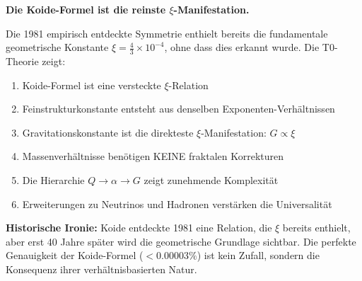 	\begin{theorem}
		\textbf{Die Koide-Formel ist die reinste $\xi$-Manifestation.}
		
		Die 1981 empirisch entdeckte Symmetrie enthielt bereits die fundamentale geometrische Konstante $\xi = \frac{4}{3} \times 10^{-4}$, ohne dass dies erkannt wurde. Die T0-Theorie zeigt:
		
		\begin{enumerate}
			\item Koide-Formel ist eine versteckte $\xi$-Relation
			\item Feinstrukturkonstante entsteht aus denselben Exponenten-Verhältnissen
			\item Gravitationskonstante ist die direkteste $\xi$-Manifestation: $G \propto \xi$
			\item Massenverhältnisse benötigen KEINE fraktalen Korrekturen
			\item Die Hierarchie $Q \to \alpha \to G$ zeigt zunehmende Komplexität
			\item Erweiterungen zu Neutrinos und Hadronen verstärken die Universalität
		\end{enumerate}
	\end{theorem}
	
	\vspace{1cm}
	
	\noindent\textbf{Historische Ironie:} Koide entdeckte 1981 eine Relation, die $\xi$ bereits enthielt, aber erst 40 Jahre später wird die geometrische Grundlage sichtbar. Die perfekte Genauigkeit der Koide-Formel ($< 0.00003\%$) ist kein Zufall, sondern die Konsequenz ihrer verhältnisbasierten Natur.
	
